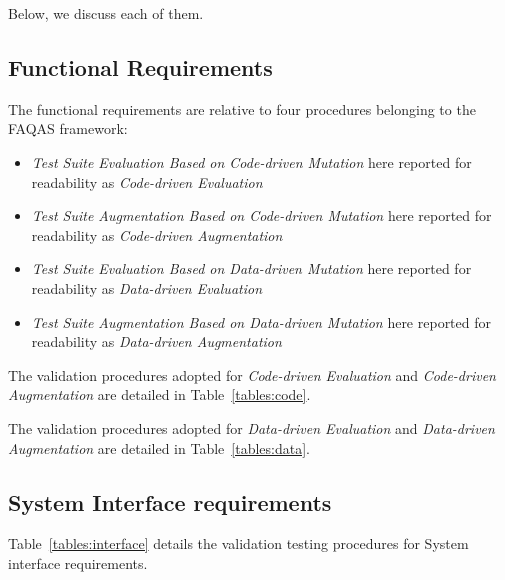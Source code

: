 Below, we discuss each of them.

\subsection{Functional Requirements}

The functional requirements are relative to four procedures belonging to the FAQAS framework:
\begin{itemize}
  \item \emph{Test Suite Evaluation Based on Code-driven Mutation} here reported for readability as \emph{Code-driven Evaluation}
  \item \emph{Test Suite Augmentation Based on Code-driven Mutation} here reported for readability as \emph{Code-driven Augmentation}
  \item \emph{Test Suite Evaluation Based on Data-driven Mutation} here reported for readability as \emph{Data-driven Evaluation}
  \item \emph{Test Suite Augmentation Based on Data-driven Mutation} here reported for readability as \emph{Data-driven Augmentation}
\end{itemize}

The validation procedures adopted for \emph{Code-driven Evaluation} and \emph{Code-driven Augmentation} are detailed in Table~\ref{tables:code}.



The validation procedures adopted for \emph{Data-driven Evaluation} and \emph{Data-driven Augmentation} are detailed in Table~\ref{tables:data}.




\clearpage

\subsection{System Interface requirements}

Table~\ref{tables:interface} details the validation testing procedures for System interface requirements.



